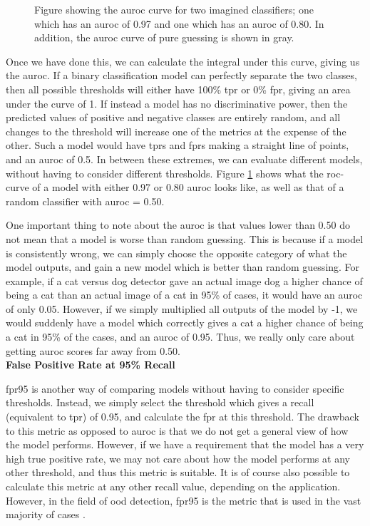 \documentclass[UKenglish]{uiomasterthesis} %
\theoremstyle{definition}
\begin{document}
\begin{figure}[H]
    \begin{center}
        
    \end{center}
    \caption[AUROC example figure]{Figure showing the \ac{auroc} curve for two imagined classifiers; one which has an \ac{auroc} of 0.97 and one which has an \ac{auroc} of 0.80. In addition, the \ac{auroc} curve of pure guessing is shown in gray.}
    \label{fig:auroc}
\end{figure}

Once we have done this, we can calculate the integral under this curve, giving us the \ac{auroc}. If a binary classification model can perfectly separate the two classes, then all possible thresholds will either have 100\% \ac{tpr} or 0\% \ac{fpr}, giving an area under the curve of 1. If instead a model has no discriminative power, then the predicted values of positive and negative classes are entirely random, and all changes to the threshold will increase one of the metrics at the expense of the other. Such a model would have \acp{tpr} and \acp{fpr} making a straight line of points, and an \ac{auroc} of 0.5. In between these extremes, we can evaluate different models, without having to consider different thresholds. Figure \ref{fig:auroc} shows what the \ac{roc}-curve of a model with either 0.97 or 0.80 \ac{auroc} looks like, as well as that of a random classifier with \ac{auroc} = 0.50. 

One important thing to note about the \ac{auroc} is that values lower than 0.50 do not mean that a model is worse than random guessing. This is because if a model is consistently wrong, we can simply choose the opposite category of what the model outputs, and gain a new model which is better than random guessing. For example, if a cat versus dog detector gave an actual image dog a higher chance of being a cat than an actual image of a cat in 95\% of cases, it would have an \ac{auroc} of only 0.05. However, if we simply multiplied all outputs of the model by -1, we would suddenly have a model which correctly gives a cat a higher chance of being a cat in 95\% of the cases, and an \ac{auroc} of 0.95. Thus, we really only care about getting \ac{auroc} scores far away from 0.50.\\

\noindent \textbf{False Positive Rate at 95\% Recall}

\noindent \ac{fpr95} is another way of comparing models without having to consider specific thresholds. Instead, we simply select the threshold which gives a recall (equivalent to \ac{tpr}) of 0.95, and calculate the \ac{fpr} at this threshold. The drawback to this metric as opposed to \ac{auroc} is that we do not get a general view of how the model performs. However, if we have a requirement that the model has a very high true positive rate, we may not care about how the model performs at any other threshold, and thus this metric is suitable. It is of course also possible to calculate this metric at any other recall value, depending on the application. However, in the field of \ac{ood} detection, \ac{fpr95} is the metric that is used in the vast majority of cases \cite{oodbaseline, odin, oodoverview, openood, vim}.
\end{document}
